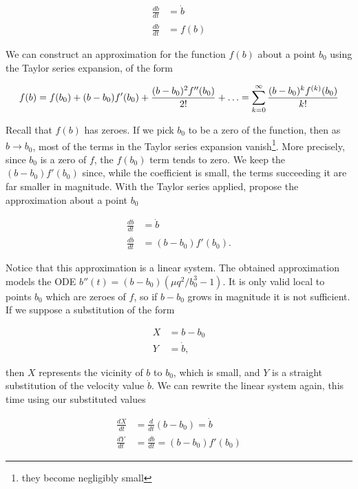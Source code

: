 \documentclass{article}
\begin{document}
\begin{align}
    \frac{db}{dt}       & = \dot{b} \\
    \frac{d\dot{b}}{dt} & = f(b)
    \label{eqn:first_order_modified}   %
\end{align}

We can construct an approximation for the function $f(b)$ about a point $b_0$ using the Taylor series expansion, of the form

\begin{equation}
    f(b) = f(b_0) + (b-b_0)f'(b_0) + \frac{(b-b_0)^2 f''(b_0)}{2!} + \mathellipsis = \sum_{k=0}^\infty\frac{(b-b_0)^{k}f^{(k)}(b_0)}{k!}
    \label{eqn:taylor_series}
\end{equation}

Recall that $f(b)$ has zeroes. If we pick $b_0$ to be a zero of the function, then as $b\rightarrow b_0$,
most of the terms in the Taylor series expansion vanish\footnote{they become negligibly small}.
More precisely, since $b_0$ is a zero of $f$, the $f(b_0)$ term tends to zero.
We keep the $(b-b_0)f'(b_0)$ since, while the coefficient is small,
the terms succeeding it are far smaller in magnitude.
With the Taylor series applied, propose the approximation about a point $b_0$

\begin{align}
    \frac{db}{dt}       & = \dot{b}         \\
    \frac{d\dot{b}}{dt} & = (b-b_0)f'(b_0).
    \label{eqn:first_order_approximated}
\end{align}

Notice that this approximation is a linear system. The obtained approximation models the ODE $b''(t) = (b-b_0)(\mu q^2/b_0^3-1)$.
It is only valid local to points $b_0$ which are zeroes of $f$, so if $b-b_0$ grows in magnitude it is not sufficient.
If we suppose a substitution of the form

\begin{align}
    X & = b - b_0  \\
    Y & = \dot{b},
\end{align}

then $X$ represents the vicinity of $b$ to $b_0$, which is small,
and $Y$ is a straight substitution of the velocity value $\dot{b}$.
We can rewrite the linear system again, this time using our substituted values

\begin{align}
    \frac{dX}{dt} & = \frac{d}{dt}\left(b-b_0\right) = \dot{b} \\
    \frac{dY}{dt} & = \frac{d\dot{b}}{dt} = (b-b_0)f'(b_0)
\end{align}
\end{document}
